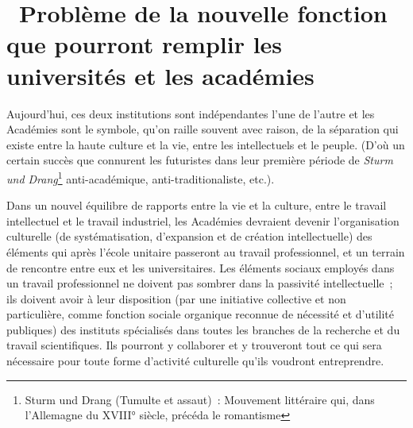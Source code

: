 \documentclass[french,twoside]{book} %
\begin{document}
\section[{ Problème de la nouvelle fonction que pourront remplir les universités et les académies}]{ Problème de la nouvelle fonction que pourront remplir les universités et les académies}
\noindent Aujourd’hui, ces deux institutions sont indépendantes l’une de l’autre et les Académies sont le symbole, qu’on raille souvent avec raison, de la séparation qui existe entre la haute culture et la vie, entre les intellectuels et le peuple. (D'où un certain succès que connurent les futuristes dans leur première période de \emph{Sturm und Drang}\footnote{Sturm und Drang (Tumulte et assaut) : Mouvement littéraire qui, dans l’Allemagne du XVIII° siècle, précéda le romantisme} anti-académique, anti-traditionaliste, etc.).\par
Dans un nouvel équilibre de rapports entre la vie et la culture, entre le travail intellectuel et le travail industriel, les Académies devraient devenir l’organisation culturelle (de systématisation, d’expansion et de création intellectuelle) des éléments qui après l’école unitaire passeront au travail professionnel, et un terrain de rencontre entre eux et les universitaires. Les éléments sociaux employés dans un travail professionnel ne doivent pas sombrer dans la passivité intellectuelle ; ils doivent avoir à leur disposition (par une initiative collective et non particulière, comme fonction sociale organique reconnue de nécessité et d’utilité publiques) des instituts spécialisés dans toutes les branches de la recherche et du travail scientifiques. Ils pourront y collaborer et y trouveront tout ce qui sera nécessaire pour toute forme d’activité culturelle qu’ils voudront entreprendre.\par
\end{document}
